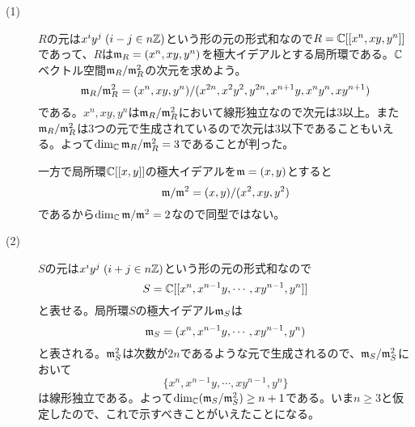 \subsubsection{}%
\begin{sol} ${}$
\begin{description}
\item[(1)] $R$の元は$x^i y^j \; (i-j \in n{\mathbb Z})$という形の元の形式和なので$R = {\mathbb C}[[x^n,xy,y^n]]$であって、$R$は$\mathfrak{m}_R = (x^n,xy,y^n)$を極大イデアルとする局所環である。${\mathbb C}$ベクトル空間$\mathfrak{m}_R / \mathfrak{m}_R^2$の次元を求めよう。
\[
\mathfrak{m}_R / \mathfrak{m}_R^2 = (x^n,xy,y^n) / (x^{2n}, x^2 y^2, y^{2n}, x^{n+1}y, x^ny^n , xy^{n+1})
\]
である。$x^n,xy,y^n$は$\mathfrak{m}_R / \mathfrak{m}_R^2$において線形独立なので次元は$3$以上。また$\mathfrak{m}_R / \mathfrak{m}_R^2$は$3$つの元で生成されているので次元は$3$以下であることもいえる。よって$\dim_{{\mathbb C}} \mathfrak{m}_R / \mathfrak{m}_R^2 = 3$であることが判った。

一方で局所環${\mathbb C}[[x,y]]$の極大イデアルを$\mathfrak{m} = (x,y)$とすると
\[
\mathfrak{m} / \mathfrak{m}^2 = (x,y) /(x^2 , xy , y^2)
\]
であるから$\dim_{{\mathbb C}} \mathfrak{m} / \mathfrak{m}^2 = 2$なので同型ではない。
\item[(2)] $S$の元は$x^i y^j \; (i+j \in n{\mathbb Z})$という形の元の形式和なので
\[
S = {\mathbb C}[[x^n, x^{n-1}y, \cdots , xy^{n-1} , y^n]]
\]
と表せる。局所環$S$の極大イデアル$\mathfrak{m}_S$は
\[
\mathfrak{m}_S = (x^n, x^{n-1}y, \cdots , xy^{n-1} , y^n)
\]
と表される。$\mathfrak{m}_S^2$は次数が$2n$であるような元で生成されるので、$\mathfrak{m}_S / \mathfrak{m}_S^2$において
\[
\{ x^n, x^{n-1}y, \cdots , xy^{n-1} , y^n \}
\]
は線形独立である。よって$\dim_{{\mathbb C}} (\mathfrak{m}_S / \mathfrak{m}_S^2) \geq n+1 $である。いま$n \geq 3$と仮定したので、これで示すべきことがいえたことになる。
\end{description}
\end{sol}
